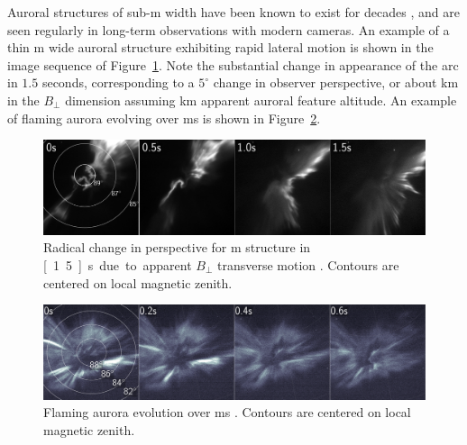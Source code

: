 Auroral structures of sub-\unit[100]{m} width have been known to exist for decades \citep{maggsdavis1968,trondsendis}, and are seen regularly in long-term observations with modern cameras.
An example of a thin \unit[100]{m} wide auroral structure exhibiting rapid lateral motion is shown in the image sequence of Figure~\ref{fig:perspTrans}.
Note the substantial change in appearance of the arc in $1.5$ seconds, corresponding to a $5^\circ$ change in observer perspective, or about \unit[10]{km} in the $B_\perp$ dimension assuming \unit[120]{km} apparent auroral feature altitude.
%
An example of flaming aurora \citep{omholtbook,dahlgren2013} evolving over \unit[600]{ms} is shown in Figure~\ref{fig:perspFlame}.
%
\begin{figure}\centering
    \includegraphics[width=\textwidth]{gfx/2007-03-23breakup}
    \caption{Radical change in perspective for \unit[100]{m} structure in \unit[1.5]{s} due to apparent $B_\perp$ transverse motion \citep{semeter2012,semeter2008}. 
    Contours are centered on local magnetic zenith.}
	\label{fig:perspTrans}
\end{figure}
%
%
%
%
\begin{figure}\centering
    \includegraphics[width=\textwidth]{gfx/2011-03-01flame}
    \caption{Flaming aurora evolution over \unit[600]{ms} \citep{dahlgren2013}.
             Contours are centered on local magnetic zenith.}
    \label{fig:perspFlame}
\end{figure}

